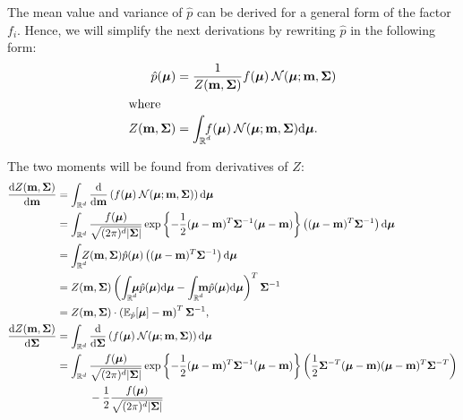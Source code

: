 \documentclass[11pt]{article}
\begin{document}
The mean value and variance of $\hat{p}$ can be derived for a general form
of the factor $f_i$. Hence, we will simplify the next derivations by 
rewriting $\hat{p}$ in the following form:
\begin{align}
	\hat{p}(\boldsymbol{\mu}) &= \frac{1}{Z(\vek{m}, \vek{\Sigma})}f(\boldsymbol{\mu})\norm(\boldsymbol{\mu}; \vek{m}, 
\vek{\Sigma})\\
\intertext{where}
	Z(\vek{m}, \vek{\Sigma}) &= \intrc f(\boldsymbol{\mu})\norm(\boldsymbol{\mu}; \vek{m}, 
\vek{\Sigma})\byd \boldsymbol{\mu}.
\end{align}

The two moments will be found from derivatives of $Z$:
\begin{align}
	\frac{\byd Z(\vek{m}, \vek{\Sigma})}{\byd \vek{m}} %
		&= \intr\frac{\byd}{\byd \vek{m}}\left(f(\boldsymbol{\mu})\norm(\boldsymbol{\mu}; 
			\vek{m}, \vek{\Sigma})\right)\byd\boldsymbol{\mu}\\
		&= \intr\frac{f(\boldsymbol{\mu})}{\sqrt{(2\pi)^d |\vek{\Sigma}|}}%
						\exp\left\{-\frac{1}{2}(\boldsymbol{\mu} - \vek{m})^T\vek{\Sigma}^{-1}(\boldsymbol{\mu} 
						- \vek{m})\right\}%
						\left((\boldsymbol{\mu} - \vek{m})^T\vek{\Sigma}^{-1}\right) \byd \boldsymbol{\mu}\\
		&= \intrc Z(\vek{m}, \vek{\Sigma}) \hat{p}(\boldsymbol{\mu})\left((\boldsymbol{\mu} 
		- \vek{m})^T\vek{\Sigma}^{-1}\right) \byd \boldsymbol{\mu}\\
		&= Z(\vek{m}, \vek{\Sigma})\left(
					\intrc\boldsymbol{\mu}    \hat{p}(\boldsymbol{\mu}) \byd \boldsymbol{\mu} %
				-	\intrc\vek{m}\hat{p}(\boldsymbol{\mu}) \byd 
		\boldsymbol{\mu}\right)^T\vek{\Sigma}^{-1}\\
		&= Z(\vek{m}, \vek{\Sigma})\cdot\left(\ee_{\hat{p}}[\boldsymbol{\mu}] 
		- \vek{m}\right)^T\vek{\Sigma}^{-1},
		\label{eq:z_by_m}
		\\
	\frac{\byd Z(\vek{m}, \vek{\Sigma})}{\byd \vek{\Sigma}} %
		&= \intr\frac{\byd}{\byd \vek{\Sigma}}\left(f(\boldsymbol{\mu})\norm(\boldsymbol{\mu}; 
			\vek{m}, \vek{\Sigma})\right) \byd\boldsymbol{\mu} \\
		&= \intr\frac{f(\boldsymbol{\mu})}{\sqrt{(2\pi)^d|\vek{\Sigma}|}}%
						\exp\left\{-\frac{1}{2}(\boldsymbol{\mu} - \vek{m})^T\vek{\Sigma}^{-1}(\boldsymbol{\mu} 
						- \vek{m})\right\}%
						\left(\frac{1}{2}\vek{\Sigma}^{-T}(\boldsymbol{\mu} - \vek{m})(\boldsymbol{\mu} 
				- \vek{m})^T\vek{\Sigma}^{-T}\right)
				\notag\\
		&\hphantom{=\intr|}
					- \frac{1}{2}\frac{f(\boldsymbol{\mu})}{\sqrt{(2\pi)^{d}|\vek{\Sigma}|}}

\end{align}
\end{document}

